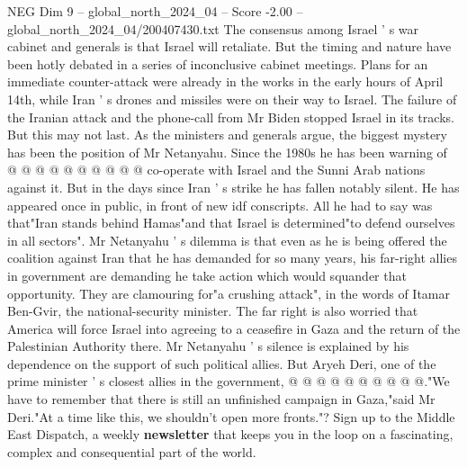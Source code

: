 \begin{textsample}{NEG Dim 9 – global\_north\_2024\_04 – Score -2.00 – global\_north\_2024\_04/200407430.txt}
The consensus among Israel ' s war cabinet and generals is that Israel will retaliate.
But the timing and nature have been hotly debated in a series of inconclusive cabinet meetings.
Plans for an immediate counter-attack were already in the works in the early hours of April 14th, while Iran ' s drones and missiles were on their way to Israel.
The failure of the Iranian attack and the phone-call from Mr Biden stopped Israel in its tracks.
But this may not last.
As the ministers and generals argue, the biggest mystery has been the position of Mr Netanyahu.
Since the 1980s he has been warning of @ @ @ @ @ @ @ @ @ @ co-operate with Israel and the Sunni Arab nations against it.
But in the days since Iran ' s strike he has fallen notably silent.
He has appeared once in public, in front of new idf conscripts.
All he had to say was that"Iran stands behind Hamas"and that Israel is determined"to defend ourselves in all sectors".
Mr Netanyahu ' s dilemma is that even as he is being offered the coalition against Iran that he has demanded for so many years, his far-right allies in government are demanding he take action which would squander that opportunity.
They are clamouring for"a crushing attack", in the words of Itamar Ben-Gvir, the national-security minister.
The far right is also worried that America will force Israel into agreeing to a ceasefire in Gaza and the return of the Palestinian Authority there.
Mr Netanyahu ' s silence is explained by his dependence on the support of such political allies.
But Aryeh Deri, one of the prime minister ' s closest allies in the government, @ @ @ @ @ @ @ @ @ @."We have to remember that there is still an unfinished campaign in Gaza,"said Mr Deri."At a time like this, we shouldn't open more fronts."?
Sign up to the Middle East Dispatch, a weekly \textbf{newsletter} that keeps you in the loop on a fascinating, complex and consequential part of the world.

\end{textsample}
